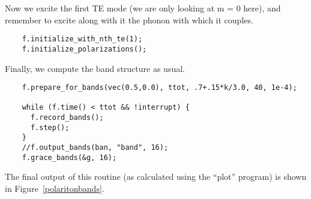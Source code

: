 Now we excite the first TE mode (we are only looking at m = 0 here), and
remember to excite along with it the phonon with which it couples.

\begin{verbatim}
    f.initialize_with_nth_te(1);
    f.initialize_polarizations();
\end{verbatim}

Finally, we compute the band structure as usual.

\begin{verbatim}
    f.prepare_for_bands(vec(0.5,0.0), ttot, .7+.15*k/3.0, 40, 1e-4);
    
    while (f.time() < ttot && !interrupt) {
      f.record_bands();
      f.step();
    }
    //f.output_bands(ban, "band", 16);
    f.grace_bands(&g, 16);
\end{verbatim}
\begin{comment}
    //fflush(ban);
  }
  //fclose(ban);
}
\end{comment}

The final output of this routine (as calculated using the ``plot'' program)
is shown in Figure~\ref{polaritonbands}.

